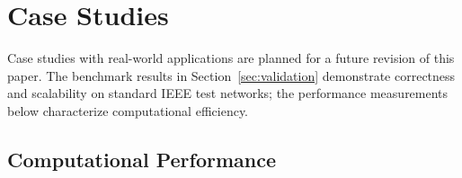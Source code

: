 
\section{Case Studies}
\label{sec:cases}

%
%
%

% 
% 
% 

Case studies with real-world applications are planned for a future
revision of this paper.  The benchmark results in
Section~\ref{sec:validation} demonstrate correctness and scalability on
standard IEEE test networks; the performance measurements below
characterize computational efficiency.


\subsection{Computational Performance}
\label{sec:performance}

